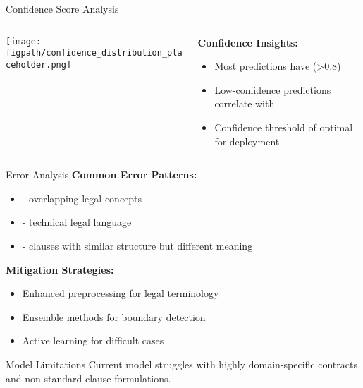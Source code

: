 \begin{frame}{Confidence Score Analysis}
\begin{columns}
\begin{column}{0.6\textwidth}
\begin{center}
\texttt{[image: \\figpath/confidence\_distribution\_placeholder.png]}
\end{center}
\end{column}
\begin{column}{0.4\textwidth}
\textbf{Confidence Insights:}
\begin{itemize}
    \item Most predictions have  (>0.8)
    \item Low-confidence predictions correlate with 
    \item Confidence threshold of  optimal for deployment
\end{itemize}
\end{column}
\end{columns}
\end{frame}

\begin{frame}{Error Analysis}
\textbf{Common Error Patterns:}
\begin{itemize}
    \item {} - overlapping legal concepts
    \item {} - technical legal language
    \item {} - clauses with similar structure but different meaning
\end{itemize}

\vspace{0.5cm}
\textbf{Mitigation Strategies:}
\begin{itemize}
    \item Enhanced preprocessing for legal terminology
    \item Ensemble methods for boundary detection
    \item Active learning for difficult cases
\end{itemize}

\vspace{0.5cm}
\begin{alertblock}{Model Limitations}
Current model struggles with highly domain-specific contracts and non-standard clause formulations.
\end{alertblock}
\end{frame}
